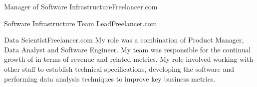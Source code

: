\begin{professionalExperience}

{Manager of Software Infrastructure}{Freelancer.com}
{}

{Software Infrastructure Team Lead}{Freelancer.com}
{}

{Data Scientist}{Freelancer.com}
{My role was a combination of Product Manager, Data Analyst and Software
Engineer. My team was responsible for the continual growth of
 in terms of revenue and related metrics. My role
involved working with other staff to establish technical specifications,
developing the software and performing data analysis techniques to improve key
business metrics.}

\end{professionalExperience}
